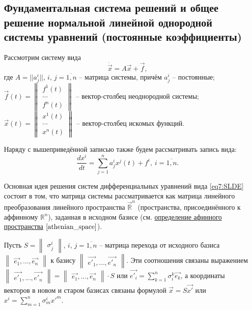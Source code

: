 \subsection{Фундаментальная система решений и общее решение нормальной линейной однородной системы уравнений (постоянные коэффициенты)}

Рассмотрим систему вида 
\begin{equation}
    \label{eq7:SLDE}
    \dot{\overrightarrow{x}} = A \overrightarrow{x} + \overrightarrow{f},
\end{equation} 
где $A = || a^i_j||$, $i,\,j = \overline{1, n}$ -- матрица системы, 
причём $a^i_j$ -- постоянные; 
$ \overrightarrow{f}(t) = 
\begin{Vmatrix}
    f^1(t) \\
    \cdots \\
    f^n(t)
\end{Vmatrix}$ -- вектор-столбец неоднородной системы;
$\overrightarrow{x}(t) = 
\begin{Vmatrix}
    x^1(t) \\
    \cdots \\
    x^n(t)
\end{Vmatrix}$ -- вектор-столбец искомых функций.  

Наряду с вышеприведённой записью также будем рассматривать запись вида: 
$$\frac{dx^i}{dt} = \sum\limits^n_{j=1}a^i_j x^j(t) + f^i, ~i = \overline{1, n}.$$

Основная идея решения систем дифференциальных уравнений вида \eqref{eq7:SLDE} 
состоит в том, что матрица системы рассматривается как матрица линейного преобразования 
линейного пространства $\overrightarrow{\mathbb{R}}^n$ (пространства, присоединённого к аффинному 
$\mathbb{R}^n$), заданная в исходном базисе (см. \hyperref[athenian_space]{определение афинного пространства} $\eqref{athenian_space}$).

Пусть $S = \begin{Vmatrix} \sigma_j^i \end{Vmatrix}$, $i,\,j = \overline{1, n}$ -- матрица перехода от исходного базиса $\begin{Vmatrix} \overrightarrow{e_1}, ..., \overrightarrow{e_n} \end{Vmatrix}$ к базису $\begin{Vmatrix} \overrightarrow{e'_1}, ..., \overrightarrow{e'_n} \end{Vmatrix}$. 
Эти соотношения связаны выражением $ \begin{Vmatrix} \overrightarrow{e'_1}, ..., \overrightarrow{e'_n} \end{Vmatrix}  = \begin{Vmatrix} \overrightarrow{e_1}, ..., \overrightarrow{e_n} \end{Vmatrix} \cdot S $ 
или $\overrightarrow{e'_i} = \sum\limits_{k = 1}^n \sigma_i^k \overrightarrow{e_k}$, а координаты векторов в новом и старом базисах связаны формулой $\overrightarrow{x} = S \overrightarrow{x'}$ или $x^i = \sum\limits_{m = 1}^n \sigma_m^i {x'}^m$.

